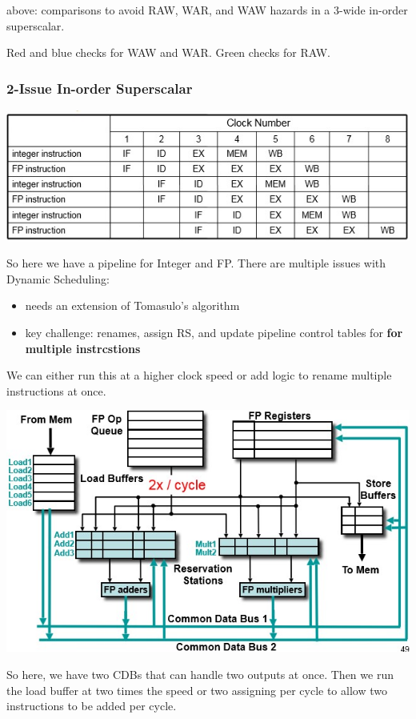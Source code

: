 \documentclass[letterpaper,12pt]{article}
\begin{document}
above: comparisons to avoid RAW, WAR, and WAW hazards in a 3-wide in-order superscalar.

Red and blue checks for WAW and WAR. Green checks for RAW.

\subsubsection{2-Issue In-order Superscalar}
\includegraphics*{Image/2-Issue In-order Superscalar.jpg}

So here we have a pipeline for Integer and FP. There are multiple issues with Dynamic Scheduling:
\begin{itemize}
    \item needs an extension of Tomasulo's algorithm
    \item key challenge: renames, assign RS, and update pipeline control tables for \textbf{for multiple instrcstions}
\end{itemize}
We can either run this at a higher clock speed or add logic to rename multiple instructions at once.

\includegraphics*[scale=0.8]{Image/Tomasulo with too wide issue.jpg}

So here, we have two CDBs that can handle two outputs at once. Then we run the load buffer at two times the speed or two assigning per cycle to allow two instructions to be added per cycle.
\end{document}
